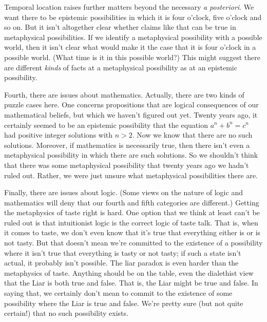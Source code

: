 \documentclass[
  11pt,
  letterpaper,
  DIV=11,
  numbers=noendperiod,
  twoside]{scrartcl}
\begin{document}
Temporal location raises further matters beyond the necessary \emph{a
posteriori}. We want there to be epistemic possibilities in which it is
four o'clock, five o'clock and so on. But it isn't altogether clear
whether claims like that can be true in metaphysical possibilities. If
we identify a metaphysical possibility with a possible world, then it
isn't clear what would make it the case that it is four o'clock in a
possible world. (What time is it in this possible world?) This might
suggest there are different \emph{kinds} of facts at a metaphysical
possibility as at an epistemic possibility.

Fourth, there are issues about mathematics. Actually, there are two
kinds of puzzle cases here. One concerns propositions that are logical
consequences of our mathematical beliefs, but which we haven't figured
out yet. Twenty years ago, it certainly seemed to be an epistemic
possibility that the equation \(a^n + b^n = c^n\) had positive integer
solutions with \(n > 2\). Now we know that there are no such solutions.
Moreover, if mathematics is necessarily true, then there isn't even a
metaphysical possibility in which there are such solutions. So we
shouldn't think that there was some metaphysical possibility that twenty
years ago we hadn't ruled out. Rather, we were just unsure what
metaphysical possibilities there are.

Finally, there are issues about logic. (Some views on the nature of
logic and mathematics will deny that our fourth and fifth categories are
different.) Getting the metaphysics of taste right is hard. One option
that we think at least can't be ruled out is that intuitionist logic is
the correct logic of taste talk. That is, when it comes to taste, we
don't even know that it's true that everything either is or is not
tasty. But that doesn't mean we're committed to the existence of a
possibility where it isn't true that everything is tasty or not tasty;
if such a state isn't actual, it probably isn't possible. The liar
paradox is even harder than the metaphysics of taste. Anything should be
on the table, even the dialethist view that the Liar is both true and
false. That is, the Liar might be true and false. In saying that, we
certainly don't mean to commit to the existence of some possibility
where the Liar is true and false. We're pretty sure (but not quite
certain!) that no such possibility exists.
\end{document}
